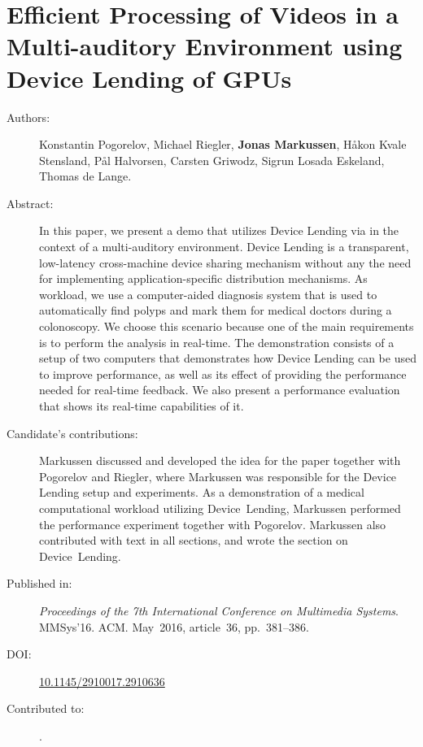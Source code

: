 \chapter{Efficient Processing of Videos in a Multi-auditory Environment using Device Lending of GPUs}
\label{paper:mmsys}
\paperthumb

\begin{description}
	\item[Authors:]
	Konstantin Pogorelov, Michael Riegler, \textbf{Jonas Markussen}, H{\aa}kon Kvale Stensland,
	P{\aa}l Halvorsen, Carsten Griwodz, Sigrun Losada Eskeland, Thomas de Lange.


	\item[Abstract:]
		In this paper, we present a demo that utilizes Device Lending 
		via  in the context of a multi-auditory
		environment. Device Lending is a transparent, low-latency
		cross-machine  device sharing mechanism without any
		the need for implementing application-specific distribution
		mechanisms. As workload, we use a computer-aided diagnosis 
		system that is used to automatically find polyps and
		mark them for medical doctors during a colonoscopy. We
		choose this scenario because one of the main requirements
		is to perform the analysis in real-time. The demonstration
		consists of a setup of two computers that demonstrates how
		Device Lending can be used to improve performance, as well
		as its effect of providing the performance needed for 
		real-time feedback. We also present a performance evaluation
		that shows its real-time capabilities of it.


	\item[Candidate's contributions:]
		Markussen discussed and developed the idea for the paper together with Pogorelov and Riegler, where Markussen was responsible for the Device Lending setup and experiments.
		As a demonstration of a medical computational workload utilizing Device~Lending,
		Markussen performed the performance experiment together with Pogorelov.
		Markussen also contributed with text in all sections, and wrote the section on Device~Lending.

	\item[Published in:]
		\emph{Proceedings of the 7th International Conference on Multimedia Systems}. 
		MMSys'16. ACM.
		May~2016, article~36, pp.~381--386.

	\item[DOI:] \href{https://doi.org/10.1145/2910017.2910636}{10.1145/2910017.2910636}

	\item[Contributed to:]
		.

\end{description}

